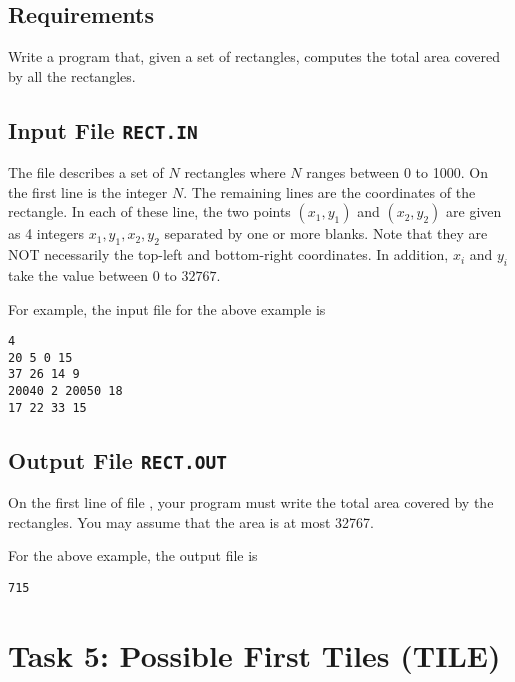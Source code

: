 \begin{center}
\end{center}

\clearpage

\subsection{Requirements}

Write a program that, given a set of rectangles, computes the total area
covered by all the rectangles.

\subsection{Input File {\tt RECT.IN}}

The file describes a set of $N$ rectangles where $N$ ranges
between 0 to 1000.  On the first line is the integer $N$.  The remaining
lines are the coordinates of the rectangle.  In each of these line,
the two points $(x_1, y_1)$ and $(x_2, y_2)$ are given as 4 integers
$x_1, y_1, x_2, y_2$ separated by one or more blanks.
Note that they are NOT
necessarily the top-left and bottom-right coordinates.
In addition,
$x_i$ and $y_i$ take the value between 0 to $32767$.

For example,
the input file for the above example is
\begin{verbatim}
4
20 5 0 15
37 26 14 9
20040 2 20050 18
17 22 33 15
\end{verbatim}

\subsection{Output File {\tt RECT.OUT}}

On the first line of file , your program must write the
total area covered by the rectangles.
You may assume that the area is at most 32767.

For the above example,
the output file is
\begin{verbatim}
715
\end{verbatim}

\newpage

\section*{Task 5: Possible First Tiles (TILE)}

\setcounter{section}{5}
\setcounter{subsection}{0}

